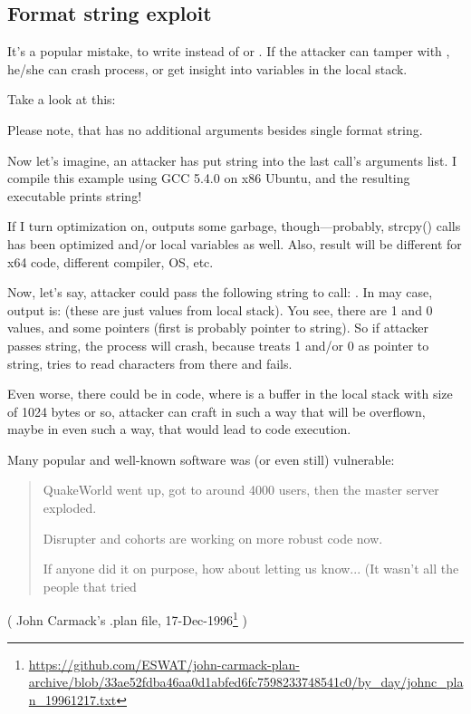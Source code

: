 \subsection{Format string exploit}

It's a popular mistake, to write  instead of  or .
If the attacker can tamper with , he/she can crash process, or get insight into variables in the local stack.

Take a look at this:



Please note, that \printf has no additional arguments besides single format string.

Now let's imagine, an attacker has put  string into the last \printf call's arguments list.
I compile this example using GCC 5.4.0 on x86 Ubuntu, and the resulting executable prints  string!

If I turn optimization on, \printf outputs some garbage, though---probably, strcpy() calls has been optimized and/or
local variables as well.
Also, result will be different for x64 code, different compiler, \ac{OS}, etc.

Now, let's say, attacker could pass the following string to \printf call: .
In may case, output is:  (these are just values from local stack).
You see, there are 1 and 0 values, and some pointers (first is probably pointer to  string).
So if attacker passes  string, the process will crash, because \printf treats 1 and/or 0
as pointer to string, tries to read characters from there and fails.

Even worse, there could be  in code, where  is a buffer in the local stack
with size of 1024 bytes or so, attacker can craft  in such a way that  will be overflown,
maybe in even such a way, that would lead to code execution.

Many popular and well-known software was (or even still) vulnerable:

\begin{framed}
\begin{quotation}
QuakeWorld went up, got to around 4000 users, then the master server exploded.

Disrupter and cohorts are working on more robust code now.

If anyone did it on purpose, how about letting us know... (It wasn't all the people that tried %
\end{quotation}
\end{framed}
( John Carmack's .plan file, 17-Dec-1996\footnote{\url{https://github.com/ESWAT/john-carmack-plan-archive/blob/33ae52fdba46aa0d1abfed6fc7598233748541c0/by_day/johnc_plan_19961217.txt}} )

